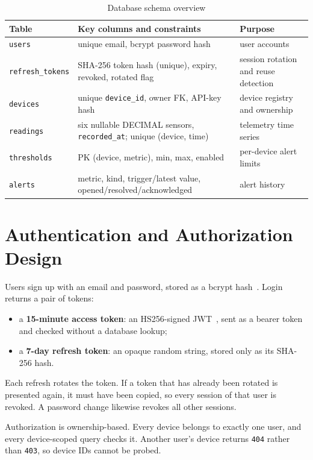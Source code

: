 \documentclass[11pt,a4paper,oneside]{report}
\newcommand{\code}[1]{\texttt{#1}}
\begin{document}
\begin{table}[htbp]
\centering
\caption{Database schema overview}
\label{tab:schema}
\small
\begin{tabularx}{\linewidth}{@{}l X X@{}}
\toprule
\textbf{Table} & \textbf{Key columns and constraints} & \textbf{Purpose} \\
\midrule
\code{users}          & unique email, bcrypt password hash & user accounts \\
\code{refresh\_tokens} & SHA-256 token hash (unique), expiry, revoked, rotated flag & session rotation and reuse detection \\
\code{devices}        & unique \code{device\_id}, owner FK, API-key hash & device registry and ownership \\
\code{readings}       & six nullable DECIMAL sensors, \code{recorded\_at}; unique (device, time) & telemetry time series \\
\code{thresholds}     & PK (device, metric), min, max, enabled & per-device alert limits \\
\code{alerts}         & metric, kind, trigger/latest value, opened/resolved/acknowledged & alert history \\
\bottomrule
\end{tabularx}
\end{table}



\section{Authentication and Authorization Design}
Users sign up with an email and password, stored as a bcrypt hash~\cite{owaspauth}.
Login returns a pair of tokens:
\begin{itemize}
  \item a \textbf{15-minute access token}: an HS256-signed JWT~\cite{rfc7519},
        sent as a bearer token and checked without a database lookup;
  \item a \textbf{7-day refresh token}: an opaque random string, stored only as its
        SHA-256 hash.
\end{itemize}
Each refresh rotates the token. If a token that has already been rotated is presented
again, it must have been copied, so every session of that user is revoked. A password
change likewise revokes all other sessions.

Authorization is ownership-based. Every device belongs to exactly one user, and every
device-scoped query checks it. Another user's device returns \code{404} rather than
\code{403}, so device IDs cannot be probed.
\end{document}
